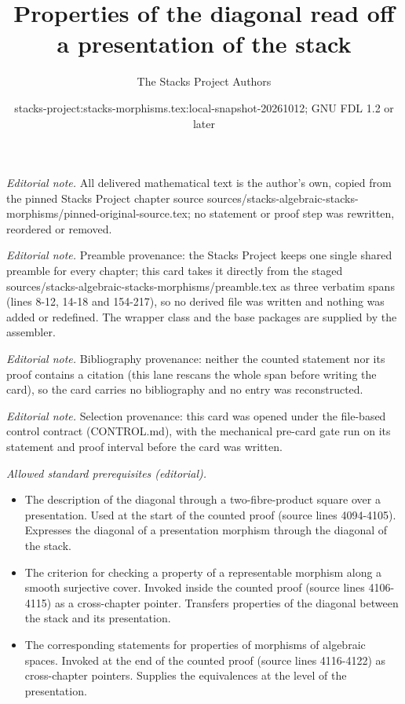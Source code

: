 \documentclass[10pt,a4paper]{amsart}
\title{Properties of the diagonal read off a presentation of the stack}
\author{The Stacks Project Authors}
\date{stacks-project:stacks-morphisms.tex:local-snapshot-20261012; GNU FDL 1.2 or later}
\theoremstyle{plain}
\theoremstyle{definition}
\theoremstyle{remark}
\numberwithin{equation}{subsection}
\begin{document}
\maketitle
\noindent\textit{Editorial note.} All delivered mathematical text is the author's own, copied from the pinned Stacks Project chapter source sources/stacks-algebraic-stacks-morphisms/pinned-original-source.tex; no statement or proof step was rewritten, reordered or removed.\par\medskip
\noindent\textit{Editorial note.} Preamble provenance: the Stacks Project keeps one single shared preamble for every chapter; this card takes it directly from the staged sources/stacks-algebraic-stacks-morphisms/preamble.tex as three verbatim spans (lines 8-12, 14-18 and 154-217), so no derived file was written and nothing was added or redefined. The wrapper class and the base packages are supplied by the assembler.\par\medskip
\noindent\textit{Editorial note.} Bibliography provenance: neither the counted statement nor its proof contains a citation (this lane rescans the whole span before writing the card), so the card carries no bibliography and no entry was reconstructed.\par\medskip
\noindent\textit{Editorial note.} Selection provenance: this card was opened under the file-based control contract (CONTROL.md), with the mechanical pre-card gate run on its statement and proof interval before the card was written.\par\medskip
\noindent\textit{Allowed standard prerequisites (editorial).}\begin{itemize}
\item The description of the diagonal through a two-fibre-product square over a presentation. Used at the start of the counted proof (source lines 4094-4105). Expresses the diagonal of a presentation morphism through the diagonal of the stack.
\item The criterion for checking a property of a representable morphism along a smooth surjective cover. Invoked inside the counted proof (source lines 4106-4115) as a cross-chapter pointer. Transfers properties of the diagonal between the stack and its presentation.
\item The corresponding statements for properties of morphisms of algebraic spaces. Invoked at the end of the counted proof (source lines 4116-4122) as cross-chapter pointers. Supplies the equivalences at the level of the presentation.
\end{itemize}\medskip
\end{document}

